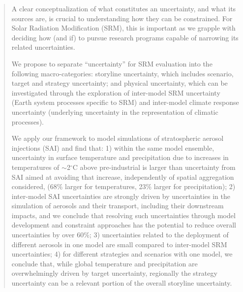 \documentclass[draft]{agujournal2019}
\begin{document}
\begin{abstract}
A clear conceptualization of what constitutes an uncertainty, and what its sources are, is crucial to understanding how they can be constrained. For Solar Radiation Modification (SRM), this is important as we grapple with deciding how (and if) to pursue research programs capable of narrowing its related uncertainties.

We propose to separate ``uncertainty'' for SRM evaluation into the following macro-categories: storyline uncertainty, which includes scenario, target and strategy uncertainty; and physical uncertainty, which can be investigated through the exploration of inter-model SRM uncertainty (Earth system processes specific to SRM) and inter-model climate response uncertainty (underlying uncertainty in the representation of climatic processes).

We apply our framework to model simulations of stratospheric aerosol injections (SAI) and find that: 1) within the same model ensemble, uncertainty in surface temperature and precipitation due to increases in temperatures of $\sim$2$^{\circ}$C above pre-industrial is larger than uncertainty from SAI aimed at avoiding that increase, independently of spatial aggregation considered, (68\% larger for temperatures, 23\% larger for precipitation); 2) inter-model SAI uncertainties are strongly driven by uncertainties in the simulation of aerosols and their transport, including their downstream impacts, and we conclude that resolving such uncertainties through model development and constraint approaches has the potential to reduce overall uncertainties by over 60\%; 3) uncertainties related to the deployment of different aerosols in one model are small compared to inter-model SRM uncertainties; 4) for different strategies and scenarios with one model, we conclude that, while global temperature and precipitation are overwhelmingly driven by target uncertainty, regionally the strategy uncertainty can be a relevant portion of the overall storyline uncertainty.
\end{abstract}
\end{document}
